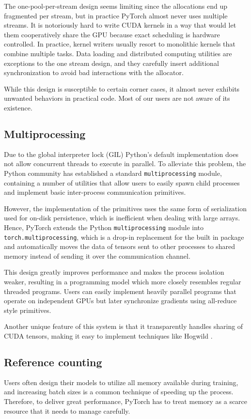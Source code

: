 The one-pool-per-stream design seems limiting since the allocations end up fragmented per stream, but in practice PyTorch almost never uses multiple streams. It is notoriously hard to write CUDA kernels in a way that would let them cooperatively share the GPU because exact scheduling is hardware controlled. In practice, kernel writers usually resort to monolithic kernels that combine multiple tasks. Data loading and distributed computing utilities are exceptions to the one stream design, and they carefully insert additional synchronization to avoid bad interactions with the allocator.

While this design is susceptible to certain corner cases, it almost never exhibits unwanted behaviors in practical code. Most of our users are not aware of its existence.


\subsection{Multiprocessing}

Due to the global interpreter lock (GIL) Python's default implementation does not allow concurrent threads to execute in parallel.
To alleviate this problem, the Python community has established a standard \verb|multiprocessing| module, containing a number of utilities that allow users to easily spawn child processes and implement basic inter-process communication primitives.

However, the implementation of the primitives uses the same form of serialization used for on-disk persistence, which is inefficient when dealing with large arrays.
Hence, PyTorch extends the Python \verb|multiprocessing| module into  \verb|torch.multiprocessing|, which is a drop-in replacement for the built in package and automatically moves the data of tensors sent to other processes to shared memory instead of sending it over the communication channel.

This design greatly improves performance and makes the process isolation weaker, resulting in a programming model which more closely resembles regular threaded programs.
Users can easily implement heavily parallel programs that operate on independent GPUs but later synchronize gradients using all-reduce style primitives.

Another unique feature of this system is that it transparently handles sharing of CUDA tensors, making it easy to implement techniques like Hogwild \cite{Hogwild}.


\subsection{Reference counting}
Users often design their models to utilize all memory available during training, and increasing batch sizes is a common technique of speeding up the process. Therefore, to deliver great performance, PyTorch has to treat memory as a scarce resource that it needs to manage carefully.


